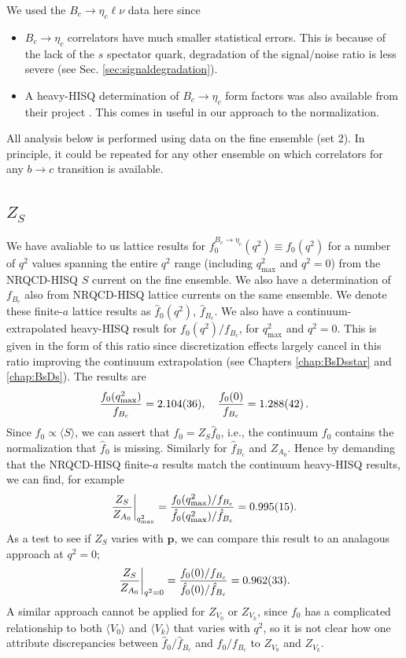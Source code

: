 We used the $B_c \to \eta_c \ell\nu$ data here since
\begin{itemize}
\item
  $B_c\to \eta_c$ correlators have much smaller statistical errors. This is because of the lack of the $s$ spectator quark, degradation of the signal/noise ratio is less severe (see Sec. \ref{sec:signaldegradation}).
\item
  A heavy-HISQ determination of $B_c\to \eta_c$ form factors was also available from their project \cite{Colquhoun:2016osw}. This comes in useful in our approach to the normalization.
\end{itemize}
All analysis below is performed using data on the fine ensemble (set 2). In principle, it could be repeated for any other ensemble on which correlators for any $b\to c$ transition is available.

\subsection{$Z_S$}
\label{sec:Zs}

We have avaliable to us lattice results for $f_0^{B_c\to \eta_c}(q^2)\equiv f_0(q^2)$ for a number of $q^2$ values spanning the entire $q^2$ range (including $q^2_{\text{max}}$ and $q^2=0$) from the NRQCD-HISQ $S$ current on the fine ensemble. We also have a determination of $f_{B_c}$ also from NRQCD-HISQ lattice currents on the same ensemble. We denote these finite-$a$ lattice results as $\hat{f}_0(q^2)$, $\hat{f}_{B_c}$. We also have a continuum-extrapolated heavy-HISQ result for $f_0(q^2)/f_{B_c}$, for $q^2_{\text{max}}$ and $q^2=0$. This is given in the form of this ratio since discretization effects largely cancel in this ratio improving the continuum extrapolation (see Chapters \ref{chap:BsDsstar} and \ref{chap:BsDs}). The results are
\begin{align}
  {f_0(q^2_{\text{max}})\over f_{B_c}} = 2.104(36),\quad {f_0(0)\over f_{B_c}} = 1.288(42)\,.
  \label{eq:Andrews_numbers}
\end{align}
Since $f_0\propto \langle S \rangle$, we can assert that $f_0 = Z_S \hat{f}_0$, i.e., the continuum $f_0$ contains the normalization that $\hat{f}_0$ is missing. Similarly for $\hat{f}_{B_c}$ and $Z_{A_0}$. Hence by demanding that the NRQCD-HISQ finite-$a$ results match the continuum heavy-HISQ results, we can find, for example
\begin{align}
  {Z_S \over Z_{A_0}}\bigg\vert_{q^2_{\text{max}}} = {f_0(q^2_{\text{max}})/f_{B_c}\over \hat{f}_0(q^2_{\text{max}})/\hat{f}_{B_c}} = 0.995(15).
\end{align}
As a test to see if $Z_S$ varies with ${\textbf{p}}$, we can compare this result to an analagous approach at $q^2=0$;
\begin{align}
  {Z_S \over Z_{A_0}}\bigg\vert_{q^2=0} = {f_0(0)/f_{B_c}\over \hat{f}_0(0)/\hat{f}_{B_c}} = 0.962(33).
\end{align}
A similar approach cannot be applied for $Z_{V_0}$ or $Z_{V_k}$, since $f_0$ has a complicated relationship to both $\langle V_0 \rangle$ and $\langle V_k \rangle$ that varies with $q^2$, so it is not clear how one attribute discrepancies between $\hat{f}_0/\hat{f}_{B_c}$ and $f_0/f_{B_c}$ to $Z_{V_0}$ and $Z_{V_k}$.

